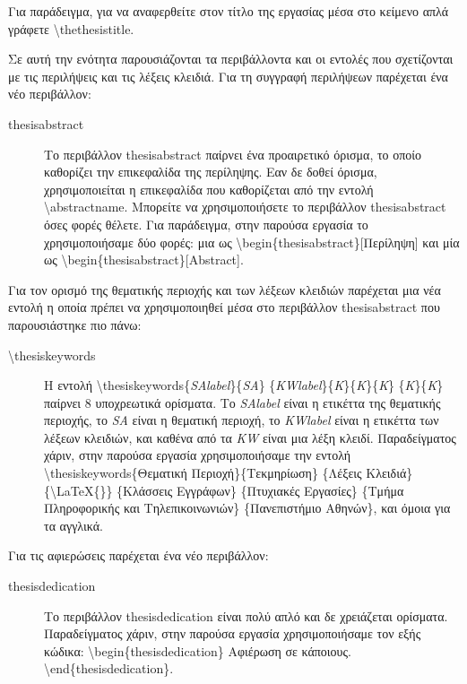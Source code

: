 \documentclass{dithesis}
\begin{document}
Για παράδειγμα, για να αναφερθείτε στον τίτλο της εργασίας μέσα στο κείμενο
απλά γράφετε \textbackslash{thethesistitle}.

Σε αυτή την ενότητα παρουσιάζονται τα περιβάλλοντα και οι εντολές που 
σχετίζονται με τις περιλήψεις και τις λέξεις κλειδιά.
Για τη συγγραφή περιλήψεων παρέχεται ένα νέο περιβάλλον:
\begin{description}
\item[thesisabstract]
  Το περιβάλλον thesisabstract παίρνει ένα προαιρετικό όρισμα, το οποίο 
  καθορίζει την επικεφαλίδα της περίληψης.
  Εαν δε δοθεί όρισμα, χρησιμοποιείται η επικεφαλίδα που καθορίζεται από
  την εντολή \textbackslash{abstractname}.
  Μπορείτε να χρησιμοποιήσετε το περιβάλλον thesisabstract όσες φορές θέλετε.
  Για παράδειγμα, στην παρούσα εργασία το χρησιμοποιήσαμε δύο φορές:
  μια ως \textbackslash{begin}{\{thesisabstract\}[Περίληψη]} και μία
  ως \textbackslash{begin}{\{thesisabstract\}[Abstract]}.
\end{description}
Για τον ορισμό της θεματικής περιοχής και των λέξεων κλειδιών παρέχεται μια
νέα εντολή η οποία πρέπει να χρησιμοποιηθεί μέσα στο περιβάλλον thesisabstract
που παρουσιάστηκε πιο πάνω:
\begin{description}
\item[\textbackslash{thesiskeywords}]
  Η εντολή \textbackslash{thesiskeywords}\{\textit{SAlabel}\}\{\textit{SA}\}%
  \{\textit{KWlabel}\}\{\textit{K}\}\{\textit{K}\}\{\textit{K}\}%
  \{\textit{K}\}\{\textit{K}\} παίρνει 8 υποχρεωτικά ορίσματα.
  Το \textit{SAlabel} είναι η ετικέττα της θεματικής περιοχής,
  το \textit{SA} είναι η θεματική περιοχή, το \textit{KWlabel} είναι
  η ετικέττα των λέξεων κλειδιών, και καθένα από τα \textit{KW} είναι μια λέξη
  κλειδί.
  Παραδείγματος χάριν, στην παρούσα εργασία χρησιμοποιήσαμε την εντολή
  \textbackslash{thesiskeywords}\{Θεματική Περιοχή\}\{Τεκμηρίωση\}
  \{Λέξεις Κλειδιά\} \{\textbackslash{LaTeX}\{\}\} \{Κλάσσεις Εγγράφων\}
  \{Πτυχιακές Εργασίες\} \{Τμήμα Πληροφορικής και Τηλεπικοινωνιών\}
  \{Πανεπιστήμιο Αθηνών\}, και όμοια για τα αγγλικά.
\end{description}

Για τις αφιερώσεις παρέχεται ένα νέο περιβάλλον:
\begin{description}
\item[thesisdedication]
  Το περιβάλλον thesisdedication είναι πολύ απλό και δε χρειάζεται ορίσματα.
  Παραδείγματος χάριν, στην παρούσα εργασία χρησιμοποιήσαμε τον εξής κώδικα:
  \textbackslash{begin}\{thesisdedication\} Αφιέρωση σε κάποιους.
  \textbackslash{end}\{thesisdedication\}.
\end{description}
\end{document}
